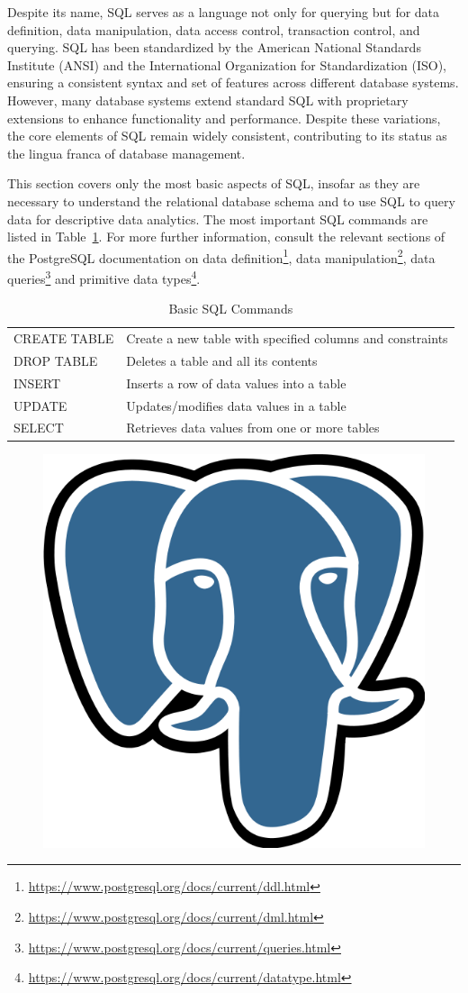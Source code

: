 Despite its name, SQL serves as a language not only for querying but for data definition, data manipulation, data access control, transaction control, and querying. SQL has been standardized by the American National Standards Institute (ANSI) and the International Organization for Standardization (ISO), ensuring a consistent syntax and set of features across different database systems. However, many database systems extend standard SQL with proprietary extensions to enhance functionality and performance. Despite these variations, the core elements of SQL remain widely consistent, contributing to its status as the lingua franca of database management. 

This section covers only the most basic aspects of SQL, insofar as they are necessary to understand the relational database schema and to use SQL to query data for descriptive data analytics. The most important SQL commands are listed in Table~\ref{tab:sql}. For more further information, consult the relevant sections of the PostgreSQL documentation on data definition\footnote{\url{https://www.postgresql.org/docs/current/ddl.html}}, data manipulation\footnote{\url{https://www.postgresql.org/docs/current/dml.html}}, data queries\footnote{\url{https://www.postgresql.org/docs/current/queries.html}} and primitive data types\footnote{\url{https://www.postgresql.org/docs/current/datatype.html}}.

\begin{table}
\renewcommand{\arraystretch}{1.25}
\centering

\begin{tabular}{l|l} \hline
CREATE TABLE & Create a new table with specified columns and constraints \\ 
DROP TABLE & Deletes a table and all its contents \\
INSERT & Inserts a row of data values into a table \\
UPDATE & Updates/modifies data values in a table \\
SELECT & Retrieves data values from one or more tables \\ \hline
\end{tabular}
\caption{Basic SQL Commands}
\label{tab:sql}
\end{table}

\begin{figure}
\begin{center}
\includegraphics[height=.5in]{postgresql-logo.png}
\end{center}
\end{figure}

